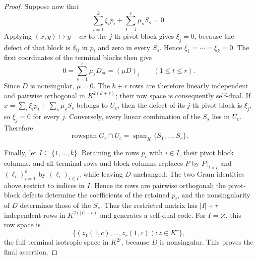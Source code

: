 \documentclass[12pt]{article}
\begin{document}
\begin{proof}
Suppose now that
\[
 \sum_{i=1}^k\xi_i p_i+\sum_{s=1}^r\mu_sS_s=0.
\]
Applying \((x,y)\mapsto y-cx\) to the \(j\)-th pivot block gives
\(\xi_j=0\), because the defect of that block is \(\delta_{ij}\) in
\(p_i\) and zero in every \(S_s\).  Hence \(\xi_1=\cdots=\xi_k=0\).
The first coordinates of the terminal blocks then give
\[
 0=\sum_{s=1}^r\mu_sD_{st}=(\mu D)_t
 \qquad(1\le t\le r).
\]
Since \(D\) is nonsingular, \(\mu=0\).  The \(k+r\) rows are therefore
linearly independent and pairwise orthogonal in \(K^{2(k+r)}\); their row
space is consequently self-dual.  If
\(x=\sum_i\xi_ip_i+\sum_s\mu_sS_s\) belongs to \(U_c\), then the defect of
its \(j\)-th pivot block is \(\xi_j\), so \(\xi_j=0\) for every \(j\).
Conversely, every linear combination of the \(S_s\) lies in \(U_c\).
Therefore
\[
 \operatorname{rowspan}G_r\cap U_c
   =\operatorname{span}_K\{S_1,\ldots,S_r\}.
\]

Finally, let \(I\subseteq\{1,\ldots,k\}\).  Retaining the rows \(p_i\)
with \(i\in I\), their pivot block columns, and all terminal rows and block
columns replaces \(P\) by \(P|_{I\times I}\) and \((\ell_i)_{i=1}^k\) by
\((\ell_i)_{i\in I}\), while leaving \(D\) unchanged.  The two Gram
identities above restrict to indices in \(I\).  Hence its rows are pairwise
orthogonal; the pivot-block defects determine the coefficients of the
retained \(p_i\), and the nonsingularity of \(D\) determines those of the
\(S_s\).  Thus the restricted matrix has \(|I|+r\) independent rows in
\(K^{2(|I|+r)}\) and generates a self-dual code.  For
\(I=\varnothing\), this row space is
\[
 \{(z_1(1,c),\ldots,z_r(1,c)):z\in K^r\},
\]
the full terminal isotropic space in \(K^{2r}\), because \(D\) is
nonsingular.  This proves the final assertion.
\end{proof}
\end{document}

